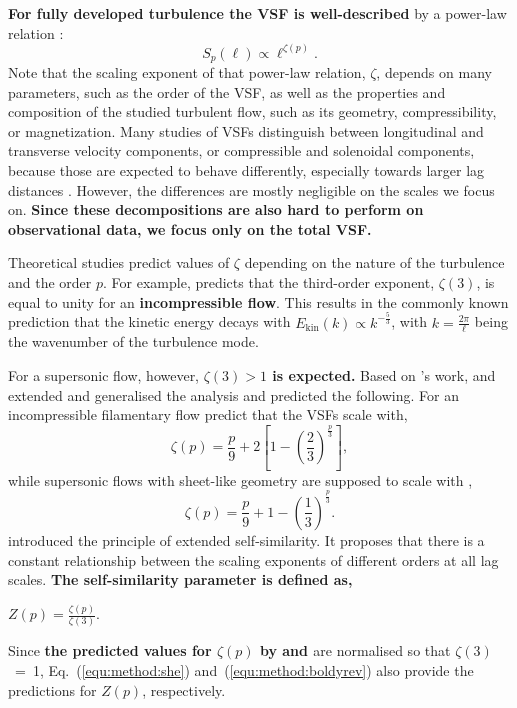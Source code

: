 \textbf{For fully developed turbulence the VSF is well-described} by a power-law relation \citep{Kolmogorov1941,She1994,Boldyrev2002}:
\begin{equation}
	\mathit{S}_p (\ell) \propto \ell^{\zeta(p)}.
    \label{equ:method:propto_zeta}
\end{equation}
Note that the scaling exponent of that power-law relation, $\zeta$, depends on many parameters, such as the order of the VSF, as well as the properties and composition of the studied turbulent flow, such as its geometry, compressibility, or magnetization.
Many studies of VSFs distinguish between longitudinal and transverse velocity components, or compressible and solenoidal components, because those are expected to behave differently, especially towards larger lag distances \citep{Gotoh2002,Schmidt2008,Benzi2010}.
However, the differences are mostly negligible on the scales we focus on. 
\textbf{Since these decompositions are also hard to perform on observational data, we focus only on the total VSF.}

Theoretical studies predict values of $\zeta$ depending on the nature of the turbulence and the order $p$.
For example, \citet{Kolmogorov1941} predicts that the third-order exponent, $\zeta(3)$, is equal to unity for an \textbf{incompressible flow}.
This results in the commonly known prediction that the kinetic energy decays with $E_{\mathrm{kin}}(k) \propto k^{-\frac{5}{3}}$, with $k = \frac{2 \pi}{\ell}$ being the wavenumber of the turbulence mode.

For a supersonic flow, however, \textbf{$\zeta(3) >1$ is expected.}
Based on \citeauthor{Kolmogorov1941}'s work, \citet{She1994} and \citet{Boldyrev2002} extended and generalised the analysis and predicted the following.
For an incompressible filamentary flow \citet{She1994} predict that the VSFs scale with,
\begin{equation}
	\zeta(p) = \frac{p}{9} + 2 \left[ 1 - \left( \frac{2}{3} \right)^{\frac{p}{3}} \right] ,
    \label{equ:method:she}
\end{equation}
while supersonic flows with sheet-like geometry are supposed to scale with \citep{Boldyrev2002},
\begin{equation}
	 \zeta(p) = \frac{p}{9} + 1 - \left( \frac{1}{3} \right)^{\frac{p}{3}}.
    \label{equ:method:boldyrev}
\end{equation}
\citet{Benzi1993} introduced the principle of extended self-similarity.
It proposes that there is a constant relationship between the scaling exponents of different orders at all lag scales. 
\textbf{The self-similarity parameter is defined as,}
\begin{definition}
	$Z(p) = \frac{\zeta(p)}{\zeta(3)}$.
	\label{equ:method:z_def}
\end{definition} 
Since \textbf{the predicted values for $\zeta(p)$ by \citet{She1994} and \citet{Boldyrev2002}} are normalised so that $\zeta(3)$~=~1, Eq.~(\ref{equ:method:she}) and~(\ref{equ:method:boldyrev}) also provide the predictions for $Z(p)$, respectively.

